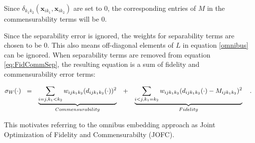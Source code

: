 \documentclass[12pt,oneside,final]{thesis}
\begin{document}

Since ${ \delta_{k_1k_2}}(\bm{x}_{ik_1},\bm{x}_{ik_2}) $ are set to 0, the corresponding entries of $M$ in the commensurability terms will be 0.

Since    the separability error is ignored,  the weights for separability terms are chosen to be 0. This also means off-diagonal elements of $L$ in equation \eqref{omnibus} can be ignored. When separability terms are removed from equation \eqref{eq:FidCommSep}, the resulting equation  is a sum of fidelity and commensurability error terms:


\begin{align}
\sigma_W(\cdot)\hspace{3pt}   
\hspace{3pt}&=&\underbrace{\sum_{i=j,k_1< k_2}  {w_{ij{k_1}{k_2}}(d_{ij{k_1}{k_2}}(\cdot))^2}}_{Commensurability}  \hspace{10pt}  &  +&\underbrace{\sum_{i< j,k_1=k_2}  {w_{ij{k_1}{k_2}}(d_{ij{k_1}{k_2}}(\cdot)-M_{ijk_1k_2})^2  }  } _{Fidelity}\notag\label{eq:FidCommSep}\hspace{10pt} .
\end{align}

This motivates  referring to the omnibus embedding approach as Joint Optimization of Fidelity and Commensurabilty (JOFC).
\end{document}

